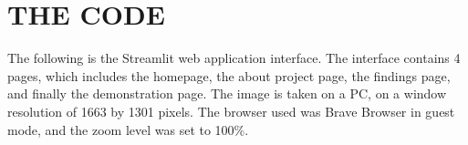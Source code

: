 \chapter{THE CODE}
\label{app:system}



The following is the Streamlit web application interface. The interface contains 4 pages, which includes the homepage, the about project page, the findings page, and finally the demonstration page. The image is taken on a PC, on a window resolution of 1663 by 1301 pixels. The browser used was Brave Browser in guest mode, and the zoom level was set to 100\%. 


